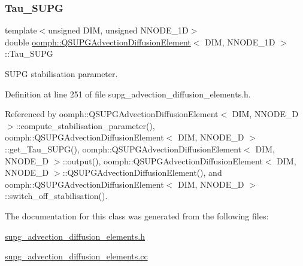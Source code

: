 \subsubsection{\texorpdfstring{Tau\+\_\+\+S\+U\+PG}{Tau\_SUPG}}
{\footnotesize\ttfamily template$<$unsigned D\+IM, unsigned N\+N\+O\+D\+E\+\_\+1D$>$ \\
double \hyperlink{classoomph_1_1QSUPGAdvectionDiffusionElement}{oomph\+::\+Q\+S\+U\+P\+G\+Advection\+Diffusion\+Element}$<$ D\+IM, N\+N\+O\+D\+E\+\_\+1D $>$\+::Tau\+\_\+\+S\+U\+PG\hspace{0.3cm}{\ttfamily [protected]}}



S\+U\+PG stabilisation parameter. 



Definition at line 251 of file supg\+\_\+advection\+\_\+diffusion\+\_\+elements.\+h.



Referenced by oomph\+::\+Q\+S\+U\+P\+G\+Advection\+Diffusion\+Element$<$ D\+I\+M, N\+N\+O\+D\+E\+\_\+D $>$\+::compute\+\_\+stabilisation\+\_\+parameter(), oomph\+::\+Q\+S\+U\+P\+G\+Advection\+Diffusion\+Element$<$ D\+I\+M, N\+N\+O\+D\+E\+\_\+D $>$\+::get\+\_\+\+Tau\+\_\+\+S\+U\+P\+G(), oomph\+::\+Q\+S\+U\+P\+G\+Advection\+Diffusion\+Element$<$ D\+I\+M, N\+N\+O\+D\+E\+\_\+D $>$\+::output(), oomph\+::\+Q\+S\+U\+P\+G\+Advection\+Diffusion\+Element$<$ D\+I\+M, N\+N\+O\+D\+E\+\_\+D $>$\+::\+Q\+S\+U\+P\+G\+Advection\+Diffusion\+Element(), and oomph\+::\+Q\+S\+U\+P\+G\+Advection\+Diffusion\+Element$<$ D\+I\+M, N\+N\+O\+D\+E\+\_\+D $>$\+::switch\+\_\+off\+\_\+stabilisation().



The documentation for this class was generated from the following files\+:\begin{DoxyCompactItemize}
\item 
\hyperlink{supg__advection__diffusion__elements_8h}{supg\+\_\+advection\+\_\+diffusion\+\_\+elements.\+h}\item 
\hyperlink{supg__advection__diffusion__elements_8cc}{supg\+\_\+advection\+\_\+diffusion\+\_\+elements.\+cc}\end{DoxyCompactItemize}
